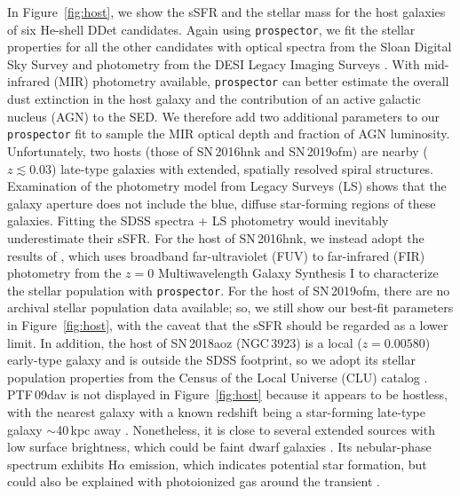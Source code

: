 \documentclass[twocolumn]{aastex631}
\begin{document}
In Figure~\ref{fig:host}, we show the sSFR and the stellar mass for the host galaxies of six He-shell DDet candidates. Again using \texttt{prospector}, we fit the stellar properties for all the other candidates with optical spectra from the Sloan Digital Sky Survey \citep[SDSS;][]{York_2000} and photometry from the DESI Legacy Imaging Surveys \citep[][$g$, $r$, $z$, $W_1$, $W_2$, $W_3$, $W_4$ magnitudes]{Dey_2019}. With mid-infrared (MIR) photometry available, \texttt{prospector} can better estimate the overall dust extinction in the host galaxy and the contribution of an active galactic nucleus (AGN) to the SED. We therefore add two additional parameters to our \texttt{prospector} fit to sample the MIR optical depth and fraction of AGN luminosity. Unfortunately, two hosts (those of SN\,2016hnk and SN\,2019ofm) are nearby ($z \lesssim 0.03$) late-type galaxies with extended, spatially resolved spiral structures. Examination of the photometry model from Legacy Surveys (LS) shows that the galaxy aperture does not include the blue, diffuse star-forming regions of these galaxies. Fitting the SDSS spectra + LS photometry would inevitably underestimate their sSFR. For the host of SN\,2016hnk, we instead adopt the results of \citet{Dong_Ca-rich_2022}, which uses broadband far-ultraviolet (FUV) to far-infrared (FIR) photometry from the $z=0$ Multiwavelength Galaxy Synthesis I \citep[z0MGS;][]{Leroy_2019} to characterize the stellar population with \texttt{prospector}. For the host of SN\,2019ofm, there are no archival stellar population data available; so, we still show our best-fit parameters in Figure~\ref{fig:host}, with the caveat that the sSFR should be regarded as a lower limit. In addition, the host of SN\,2018aoz (NGC\,3923) is a local ($z=0.00580$) early-type galaxy and is outside the SDSS footprint, so we adopt its stellar population properties from the Census of the Local Universe (CLU) catalog \citep{Cook_2019}. PTF\,09dav is not displayed in Figure~\ref{fig:host} because it appears to be hostless, with the nearest galaxy with a known redshift being a star-forming late-type galaxy $\sim$40\,kpc away \citep{Sullivan_2011}. Nonetheless, it is close to several extended sources with low surface brightness, which could be faint dwarf galaxies \citep[see Figure 3 in][]{Kasliwal_2012}. Its nebular-phase spectrum exhibits H$\alpha$ emission, which indicates potential star formation, but could also be explained with photoionized gas around the transient \citep{Kasliwal_2012}.
\end{document}
